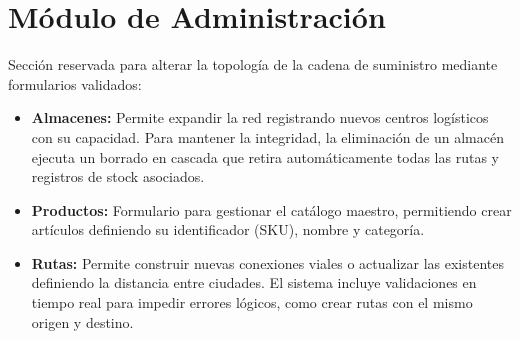 \section{Módulo de Administración}
Sección reservada para alterar la topología de la cadena de suministro mediante formularios validados:
\begin{itemize}
    \item \textbf{Almacenes:} Permite expandir la red registrando nuevos centros logísticos con su capacidad. Para mantener la integridad, la eliminación de un almacén ejecuta un borrado en cascada que retira automáticamente todas las rutas y registros de stock asociados.
    \item \textbf{Productos:} Formulario para gestionar el catálogo maestro, permitiendo crear artículos definiendo su identificador (SKU), nombre y categoría.
    \item \textbf{Rutas:} Permite construir nuevas conexiones viales o actualizar las existentes definiendo la distancia entre ciudades. El sistema incluye validaciones en tiempo real para impedir errores lógicos, como crear rutas con el mismo origen y destino.
\end{itemize}
